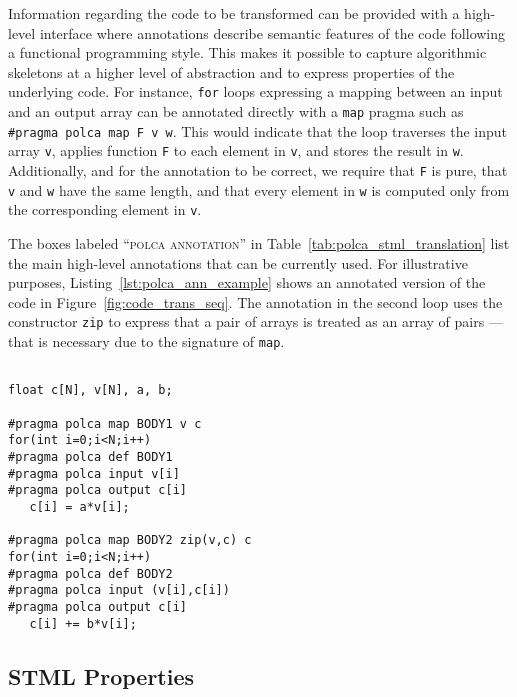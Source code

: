 \documentclass[svgnames,usenames,preprint,nocopyrightspace]{sigplanconf}
\begin{document}
Information regarding the code to be transformed can be provided with
a high-level interface where annotations
describe semantic features of the code  following a functional
programming style.  This makes it possible to 
capture algorithmic skeletons at a higher level of abstraction and to
express properties of the underlying code.
For instance, \texttt{for} loops expressing a mapping between an input and
an output array can be annotated directly with a \texttt{map} pragma
such as \texttt{\#pragma polca map F v w}.  This would indicate that
the loop   traverses the input array \texttt{v}, applies function
\texttt{F} to each element in \texttt{v}, and stores the result in
\texttt{w}.  Additionally, and for the annotation to be correct, we
require that \texttt{F} is pure, that \texttt{v} and \texttt{w} have
the same length, and that every element in \texttt{w}
is computed only from the corresponding element in \texttt{v}.

The boxes labeled ``\textsc{polca annotation}'' in
Table~\ref{tab:polca_stml_translation} list the main high-level
annotations that can be currently used.
For illustrative purposes, Listing~\ref{lst:polca_ann_example} shows
an annotated version of the code in Figure~\ref{fig:code_trans_seq}.
The annotation in the second loop uses the constructor \texttt{zip} to
express that a pair of arrays is treated as an array of pairs ---that
is necessary due to the signature of \texttt{map}.


\begin{lstlisting}[basicstyle =
  \ttfamily\scriptsize,caption=Annotations for the initial code in Figure \ref{fig:code_trans_seq}.,label=lst:polca_ann_example]

float c[N], v[N], a, b;

#pragma polca map BODY1 v c
for(int i=0;i<N;i++)
#pragma polca def BODY1
#pragma polca input v[i]
#pragma polca output c[i]
   c[i] = a*v[i];

#pragma polca map BODY2 zip(v,c) c
for(int i=0;i<N;i++)
#pragma polca def BODY2
#pragma polca input (v[i],c[i])
#pragma polca output c[i]
   c[i] += b*v[i];
\end{lstlisting} 



\subsection{STML Properties}
\label{sec:stml_ann}
\end{document}
